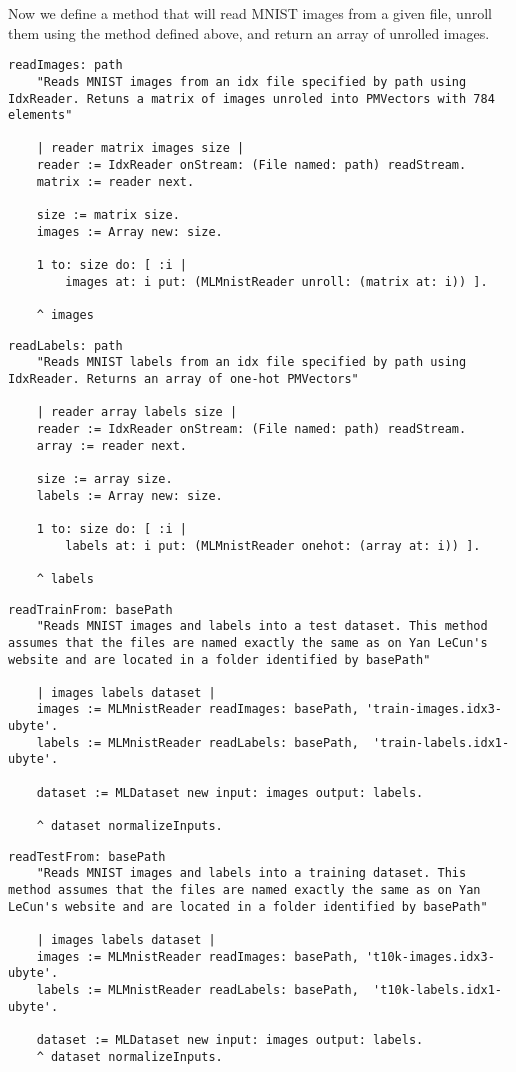 Now we define a method that will read MNIST images from a given file, unroll them using the method defined above, and return an array of unrolled images.

\begin{lstlisting}
readImages: path
	"Reads MNIST images from an idx file specified by path using IdxReader. Retuns a matrix of images unroled into PMVectors with 784 elements"

	| reader matrix images size |
	reader := IdxReader onStream: (File named: path) readStream.
	matrix := reader next.
	
	size := matrix size.
	images := Array new: size.
	
	1 to: size do: [ :i |
		images at: i put: (MLMnistReader unroll: (matrix at: i)) ].
	
	^ images
\end{lstlisting}

\begin{lstlisting}
readLabels: path
	"Reads MNIST labels from an idx file specified by path using IdxReader. Returns an array of one-hot PMVectors"

	| reader array labels size |
	reader := IdxReader onStream: (File named: path) readStream.
	array := reader next.
	
	size := array size.
	labels := Array new: size.
	
	1 to: size do: [ :i |
		labels at: i put: (MLMnistReader onehot: (array at: i)) ].
	
	^ labels
\end{lstlisting}

\begin{lstlisting}
readTrainFrom: basePath
	"Reads MNIST images and labels into a test dataset. This method assumes that the files are named exactly the same as on Yan LeCun's website and are located in a folder identified by basePath"

	| images labels dataset |
	images := MLMnistReader readImages: basePath, 'train-images.idx3-ubyte'.
	labels := MLMnistReader readLabels: basePath,  'train-labels.idx1-ubyte'.
	
	dataset := MLDataset new input: images output: labels.
	
	^ dataset normalizeInputs.
\end{lstlisting}

\begin{lstlisting}
readTestFrom: basePath
	"Reads MNIST images and labels into a training dataset. This method assumes that the files are named exactly the same as on Yan LeCun's website and are located in a folder identified by basePath"

	| images labels dataset |
	images := MLMnistReader readImages: basePath, 't10k-images.idx3-ubyte'.
	labels := MLMnistReader readLabels: basePath,  't10k-labels.idx1-ubyte'.
	
	dataset := MLDataset new input: images output: labels.
	^ dataset normalizeInputs.
\end{lstlisting}

